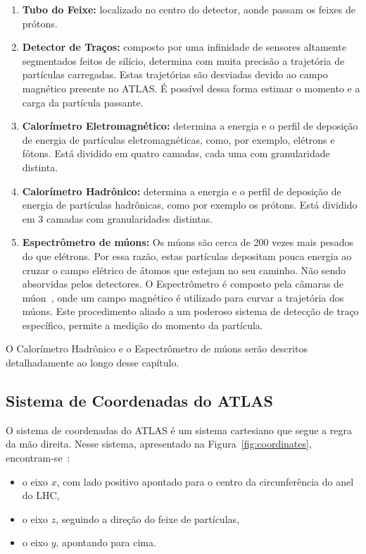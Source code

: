 \begin{enumerate}
    \item {\bf Tubo do Feixe:} localizado no centro do detector, aonde passam os
    feixes de prótons.
    \item {\bf Detector de Traços:} composto por uma infinidade de sensores
    altamente segmentados feitos de silício, determina com muita precisão a
    trajetória de partículas carregadas. Estas trajetórias são desviadas devido
    ao campo magnético presente no ATLAS. É possível dessa forma estimar o
    momento e a carga da partícula passante.
    \item {\bf Calorímetro Eletromagnético:} determina a energia e o perfil de
    deposição de energia de partículas eletromagnéticas, como, por exemplo,
    elétrons e fótons. Está dividido em quatro camadas, cada uma com
    granularidade distinta.
    \item {\bf Calorímetro Hadrônico:} determina a energia e o perfil de
    deposição de energia de partículas hadrônicas, como por exemplo os prótons.
    Está dividido em 3 camadas  com granularidades distintas.
    \item {\bf Espectrômetro de múons:} Os múons são cerca de 200 vezes mais
    pesados do que elétrons. Por essa razão, estas partículas depositam pouca
    energia ao cruzar o campo elétrico de átomos que estejam no seu caminho.
    Não sendo absorvidas pelos detectores.  O Espectrômetro é composto pela
    câmaras de múon~\cite{ref:atlas2009}, onde um campo magnético é utilizado
    para curvar a trajetória dos múons. Este procedimento aliado a um poderoso
    sistema de detecção de traço específico, permite a medição do momento da
    partícula.

\end{enumerate}

O Calorímetro Hadrônico e o Espectrômetro de múons serão descritos
detalhadamente ao longo desse capítulo.

\subsection[Sistema de Coordenadas]{Sistema de Coordenadas do ATLAS}

O sistema de coordenadas do ATLAS é um sistema cartesiano que segue a regra da
mão direita. Nesse sistema, apresentado na Figura~\ref{fig:coordinates},
encontram-se~\cite{EGEDE1998}:


\begin{itemize}
    \item o eixo $x$, com lado positivo apontado para o centro da
    circunferência do anel do LHC,
    \item o eixo $z$, seguindo a direção do feixe de partículas,
    \item o eixo $y$, apontando para cima.
\end{itemize}

